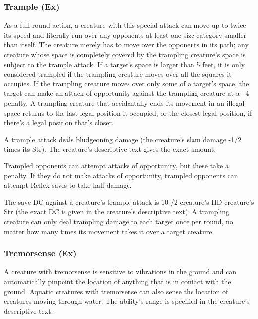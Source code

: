 \subsubsection{Trample (Ex)} As a full-round action, a creature with this special attack can move up to twice its speed and literally run over any opponents at least one size category smaller than itself. The creature merely has to move over the opponents in its path; any creature whose space is completely covered by the trampling creature's space is subject to the trample attack. If a target's space is larger than 5 feet, it is only considered trampled if the trampling creature moves over all the squares it occupies. If the trampling creature moves over only some of a target's space, the target can make an attack of opportunity against the trampling creature at a –4 penalty. A trampling creature that accidentally ends its movement in an illegal space returns to the last legal position it occupied, or the closest legal position, if there's a legal position that's closer.

A trample attack deals bludgeoning damage (the creature's slam damage -1/2 times its Str). The creature's descriptive text gives the exact amount.

Trampled opponents can attempt attacks of opportunity, but these take a  penalty. If they do not make attacks of opportunity, trampled opponents can attempt Reflex saves to take half damage.

The save DC against a creature's trample attack is 10 /2 creature's HD \add creature's Str (the exact DC is given in the creature's descriptive text). A trampling creature can only deal trampling damage to each target once per round, no matter how many times its movement takes it over a target creature.

\subsubsection{Tremorsense (Ex)} A creature with tremorsense is sensitive to vibrations in the ground and can automatically pinpoint the location of anything that is in contact with the ground. Aquatic creatures with tremorsense can also sense the location of creatures moving through water. The ability's range is specified in the creature's descriptive text.

